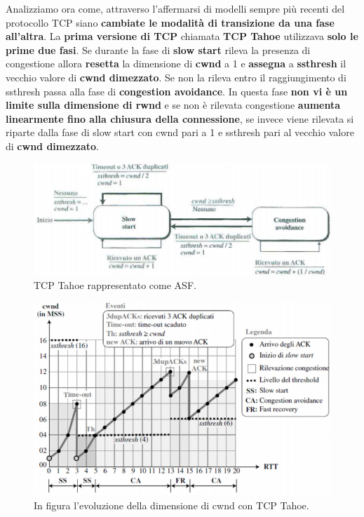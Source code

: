 \documentclass[11pt,a4paper]{article}
\theoremstyle{definition}
\begin{document}
Analizziamo ora come, attraverso l'affermarsi di modelli sempre più recenti del protocollo TCP siano \textbf{cambiate le modalità di transizione da una fase all'altra}.
La \textbf{prima versione di TCP} chiamata \textbf{TCP Tahoe} utilizzava \textbf{solo le prime due fasi}. Se durante la fase di \textbf{slow start} rileva la presenza di congestione allora \textbf{resetta} la dimensione di \textbf{cwnd} a 1 e \textbf{assegna} a \textbf{ssthresh} il vecchio valore di \textbf{cwnd dimezzato}. Se non la rileva entro il raggiungimento di ssthresh passa alla fase di \textbf{congestion avoidance}. In questa fase \textbf{non vi è un limite sulla dimensione di rwnd} e se non è rilevata congestione \textbf{aumenta linearmente fino alla chiusura della connessione}, se invece viene rilevata si riparte dalla fase di slow start con cwnd pari a 1 e ssthresh pari al vecchio valore di \textbf{cwnd dimezzato}.
\begin{figure}[!h]
	\includegraphics[scale=0.3]{Immagini/Taho.png}
	\centering
	\caption{TCP Tahoe rappresentato come ASF.}
\end{figure}\newline
\begin{figure}[!h]
	\includegraphics[scale=0.23]{Immagini/Taho2.png}
	\centering
	\caption{In figura l'evoluzione della dimensione di cwnd con TCP Tahoe.}
\end{figure}
\end{document}
